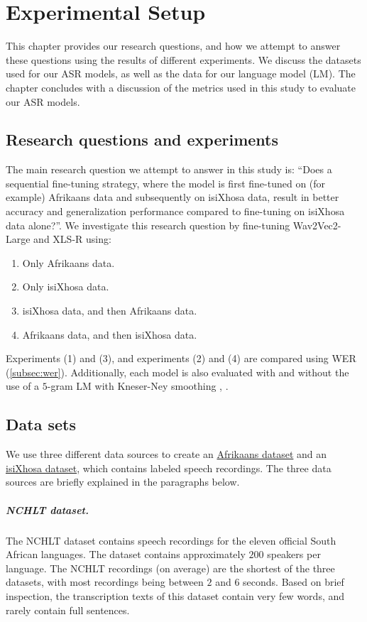 \graphicspath{{experimental_setup/fig/}}

\chapter{Experimental Setup} \label{chap:experimental_setup}
This chapter provides our research questions, and how we attempt to answer
these questions using the results of different experiments. We discuss the datasets used for
our ASR models, as well as the data for our language model (LM).
The chapter concludes with a discussion of the metrics used in this study to evaluate our ASR models.

\section{Research questions and experiments}
The main research question we attempt to answer in this study is: ``Does a sequential fine-tuning strategy, where the model is first fine-tuned on (for example) Afrikaans data and subsequently on isiXhosa data, result in better accuracy and generalization performance compared to fine-tuning on isiXhosa data alone?''.
We investigate this research question by fine-tuning Wav2Vec2-Large and XLS-R using:
\begin{enumerate}
    \item Only Afrikaans data.
    \item Only isiXhosa data.
    \item isiXhosa data, and then Afrikaans data.
    \item Afrikaans data, and then isiXhosa data.
\end{enumerate}
Experiments (1) and (3), and experiments (2) and (4) are compared using WER (\ref{subsec:wer}).
Additionally, each model is also evaluated with and without the use of a $5$-gram LM with Kneser-Ney smoothing \cite{shannon1948}, \cite{ney1994structuring}.

\section{Data sets}
We use three different data sources to create an \href{https://huggingface.co/datasets/lucas-meyer/asr_af}{Afrikaans dataset} and an \href{https://huggingface.co/datasets/lucas-meyer/asr_xh}{isiXhosa dataset}, which contains labeled speech recordings.
The three data sources are briefly explained in the paragraphs below.

\paragraph*{NCHLT dataset.}
The NCHLT \cite{barnard2014nchlt} dataset contains speech recordings for the eleven official South African languages.
The dataset contains approximately $200$ speakers per language.
The NCHLT recordings (on average) are the shortest of the three datasets, with most recordings being between $2$ and $6$ seconds.
Based on brief inspection, the transcription texts of this dataset contain very few words, and rarely contain full sentences.

